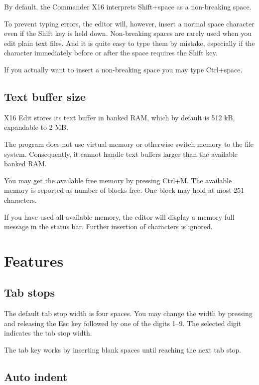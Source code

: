 \documentclass{article}
\begin{document}
        By default, the Commander X16 interprets Shift+space as a non-breaking space. 
        
        To prevent typing errors, the editor will, however, insert a normal space character even if the Shift key is held down.
        Non-breaking spaces are rarely used when you edit plain text files. And it is quite easy to type them by mistake,
        especially if the character immediately before or after the space requires the Shift key.

        If you actually want to insert a non-breaking space you may type Ctrl+space.

    \subsection{Text buffer size}

        X16 Edit stores its text buffer in banked RAM, which by default is 512 kB,
        expandable to 2 MB. 
        
        The program does not use virtual memory or otherwise
        switch memory to the file system. Consequently, it cannot handle text
        buffers larger than the available banked RAM.

        You may get the available free memory by pressing Ctrl+M. The available memory is 
        reported as number of blocks free. One block may hold at most 251 characters.

        If you have used all available memory, the editor will display a memory
        full message in the status bar. Further insertion of characters is ignored.

\section{Features}

    \subsection{Tab stops}

        The default tab stop width is four spaces. You may change the width by pressing and releasing the Esc key followed
        by one of the digits 1--9. The selected digit indicates the tab stop width.
        
        The tab key works by inserting blank spaces until reaching the next tab stop.

    \subsection{Auto indent}
    
\end{document}
